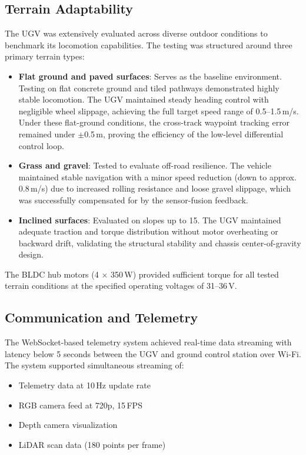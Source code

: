 \documentclass[conference]{IEEEtran}
\begin{document}
\subsection{Terrain Adaptability}

The UGV was extensively evaluated across diverse outdoor conditions to benchmark its locomotion capabilities. The testing was structured around three primary terrain types:
\begin{itemize}
    \item \textbf{Flat ground and paved surfaces}: Serves as the baseline environment. Testing on flat concrete ground and tiled pathways demonstrated highly stable locomotion. The UGV maintained steady heading control with negligible wheel slippage, achieving the full target speed range of 0.5--1.5\,m/s. Under these flat-ground conditions, the cross-track waypoint tracking error remained under $\pm$0.5\,m, proving the efficiency of the low-level differential control loop.
    \item \textbf{Grass and gravel}: Tested to evaluate off-road resilience. The vehicle maintained stable navigation with a minor speed reduction (down to approx. 0.8\,m/s) due to increased rolling resistance and loose gravel slippage, which was successfully compensated for by the sensor-fusion feedback.
    \item \textbf{Inclined surfaces}: Evaluated on slopes up to 15\textdegree. The UGV maintained adequate traction and torque distribution without motor overheating or backward drift, validating the structural stability and chassis center-of-gravity design.
\end{itemize}

The BLDC hub motors (4 $\times$ 350\,W) provided sufficient torque for all tested terrain conditions at the specified operating voltages of 31--36\,V.

\subsection{Communication and Telemetry}

The WebSocket-based telemetry system achieved real-time data streaming with latency below 5 seconds between the UGV and ground control station over Wi-Fi. The system supported simultaneous streaming of:
\begin{itemize}
    \item Telemetry data at 10\,Hz update rate
    \item RGB camera feed at 720p, 15\,FPS
    \item Depth camera visualization
    \item LiDAR scan data (180 points per frame)
\end{itemize}
\end{document}
